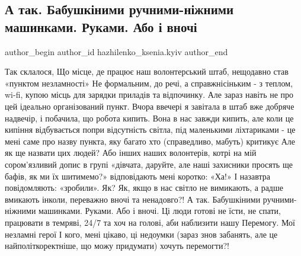  
 
 
 
 
 
\subsection{А так. Бабушкіними ручними-ніжними машинками. Руками. Або і вночі}
\label{sec:08_12_2022.fb.hazhilenko_ksenia.kyiv.1.rukamy_vnochi}
 
\ifcmt
 author_begin
   author_id hazhilenko_ksenia.kyiv
 author_end
\fi

\obeycr
Так склалося, 
Що місце, де працює наш волонтерський штаб, нещодавно став «пунктом незламності»
Не формальним, до речі, а справжнісіньким - з теплом, wi-fi, купою місць для зарядки приладів та відпочинку.
Але зараз навіть не про цей ідеально організований пункт.
Вчора ввечері я завітала в штаб вже добряче надвечір, і побачила, що робота кипить. 
Вона в нас завжди кипить, але коли це кипіння відбувається попри відсутність світла, під маленькими ліхтариками - це мені саме про назву пункта, яку багато хто (справедливо, мабуть) критикує
Але як ще назвати цих людей?
Або інших наших волонтерів, котрі на мій сором'язливий допис в групі «дівчата, даруйте, але наші захисники просять ще бафів, як ми їх шитимемо?» відповідають мені коротко: «Ха!»
І назавтра повідомляють: «зробили».
Як? Як, якщо в нас світло не вимикають, а радше вмикають інколи, переважно вночі та ненадовго?!
А так. Бабушкіними ручними-ніжними машинками. Руками. Або і вночі. 
Ці люди готові не їсти, не спати, працювати в темряві, 24/7 та хоч на голові, аби наблизити нашу Перемогу.
Мої незламні герої 
І кого, мені цікаво, ці недоумки (зараз знов забанять, але це найполіткоректніше, що можу придумати) хочуть перемогти?!
\restorecr

